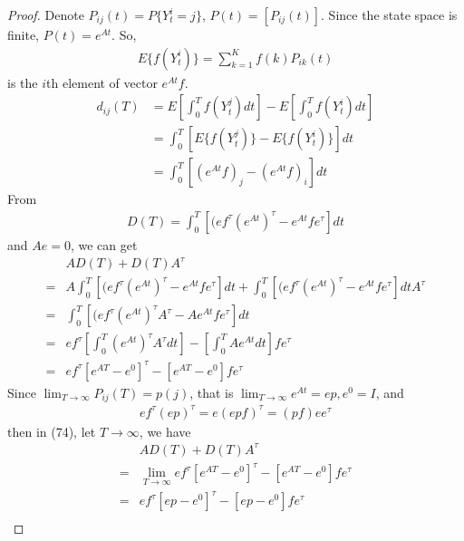 \documentclass[runningheads]{llncs}
\begin{document}
    \begin{proof}
        Denote $P_{ij}(t) = P \{ Y_t^i = j \}$, $P(t) = [P_{ij}(t)]$.
        Since the state space is finite, $P(t) = e^{At}$.
        So,
        \begin{align}
            E \{ f(Y_t^i) \} = \sum_{k=1}^K f(k) P_{ik}(t)
        \end{align}
        is the $i$th element of vector $e^{At} f$.
        \begin{align}
            d_{ij}(T) &= E [ \int_0^T f(Y_t^j)dt ] -  E [ \int_0^T f(Y_t^i)dt ] \\
            &= \int_0^T [ E\{f(Y_t^j)\} - E\{f(Y_t^i)\} ]dt \\
            &= \int_0^T [ (e^{At} f)_j - (e^{At} f)_i ]dt
        \end{align}
        From
        \begin{align}
            D(T) = \int_0^T [ (ef^\tau(e^{At})^\tau - e^{At}fe^\tau ]dt
        \end{align}
        and $Ae = 0$, we can get
        \begin{align}
            &AD(T) + D(T)A^\tau \\
            = &A\int_0^T [ (ef^\tau(e^{At})^\tau - e^{At}fe^\tau ]dt
            + \int_0^T [ (ef^\tau(e^{At})^\tau - e^{At}fe^\tau ]dt A^\tau \\
            = &\int_0^T [ (ef^\tau(e^{At})^\tau A^\tau - Ae^{At}fe^\tau ]dt \\
            = &ef^\tau [ \int_0^T (e^{At})^\tau A^\tau dt ] - [\int_0^T Ae^{At} dt] fe^\tau\\
            = &ef^\tau [e^{AT} - e^0]^\tau - [e^{AT} - e^0] fe^\tau
        \end{align}
        Since $\mathop{\lim}_{T \rightarrow \infty} P_{ij}(T) = p(j)$,
        that is $\mathop{\lim}_{T \rightarrow \infty} e^{At} = ep, e^0 = I$,
        and 
        \begin{align}
            ef^\tau(ep)^\tau = e(epf)^\tau = (pf)ee^\tau
        \end{align}
        then in (74), let $T \rightarrow \infty$, we have
        \begin{align}
            &AD(T) + D(T)A^\tau \\
            = &\mathop{\lim}_{T\rightarrow\infty}ef^\tau [e^{AT} - e^0]^\tau - [e^{AT} - e^0] fe^\tau \\
            = &ef^\tau [ep - e^0]^\tau - [ep - e^0] fe^\tau \\

\end{align}
\end{proof}
\end{document}
